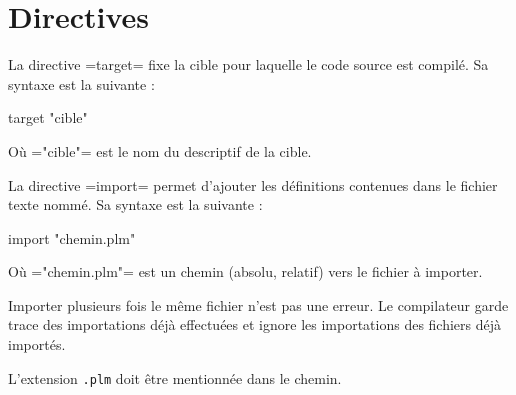 




\chapter{Directives}



La directive \plm=target= fixe la cible pour laquelle le code source est compilé. Sa syntaxe est la suivante :
\begin{PLM}
target "cible"
\end{PLM} 
Où \plm="cible"= est le nom du descriptif de la cible.







La directive \plm=import= permet d'ajouter les définitions contenues dans le fichier texte nommé. Sa syntaxe est la suivante :
\begin{PLM}
import "chemin.plm"
\end{PLM} 
Où \plm="chemin.plm"= est un chemin (absolu, relatif) vers le fichier à importer.

Importer plusieurs fois le même fichier n'est pas une erreur. Le compilateur garde trace des importations déjà effectuées et ignore les importations des fichiers déjà importés.

L'extension \texttt{.plm} doit être mentionnée dans le chemin.